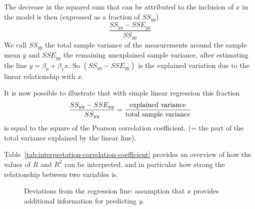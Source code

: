 The decrease in the squared sum that can be attributed to the inclusion of $x$ in the model is then (expressed as a fraction of $SS_{yy}$)
\[ \frac{SS_{yy} - SSE_{yy}}{SS_{yy}} \]
We call $SS_{yy}$ the total sample variance of the measurements around the sample mean $\overline{y}$ and $SSE_{yy}$ the remaining unexplained sample variance, after estimating the line $\widehat{y} = \beta_{0} + \beta_{1}x$. So $(SS_{yy} - SSE_{yy})$ is the explained variation due to the linear relationship with $x$.

It is now possible to illustrate that with simple linear regression this fraction 
\[ \frac{SS_{yy} - SSE_{yy}}{SS_{yy}} = \frac{\textnormal{explained variance}}{\textnormal{total sample variance}} \]
is equal to the square of the Pearson correlation coefficient. (= the part of the total variance explained by the linear line).

Table~\ref{tab:interpretation-correlation-coefficient} provides an overview of how the values of $R$ and $R^2$ can be interpreted, and in particular how strong the relationship between two variables is.

\begin{figure}
  \caption{Deviations from the regression line: assumption that $x$ provides additional information for predicting $y$.}
	\label{fig:reindeerFigure2}
\end{figure}


